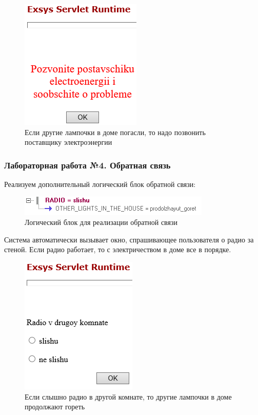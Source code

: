 \documentclass[14pt,a4paper,report]{report}
\begin{document}
\begin{figure}[h!]
	\centering
	\includegraphics[scale = 1.1]{images/3_8.png}
	\caption{Если другие лампочки в доме погасли, то надо позвонить поставщику электроэнергии}
\end{figure}

\subsubsection{Лабораторная работа №4. Обратная связь}

Реализуем дополнительный логический блок обратной связи:

\begin{figure}[h!]
	\centering
	\includegraphics[scale = 1.2]{images/4_1.png}
	\caption{Логический блок для реализации обратной связи}
\end{figure}

Система автоматически вызывает окно, спрашивающее пользователя о радио за стеной. Если радио работает, то с электричеством в доме все в порядке.

\clearpage

\begin{figure}[h!]
	\centering
	\includegraphics[scale = 1.1]{images/4_2.png}
	\caption{Если слышно радио в другой комнате, то другие лампочки в доме продолжают гореть}
\end{figure}
\end{document}
